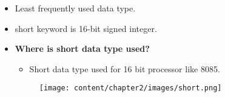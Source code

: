 

\begin{flushleft}
	\begin{itemize}
		\item Least frequently used data type.
		\item short keyword is 16-bit signed integer. 
		
		\bigskip
		\item \textbf{Where is short data type used?}
		\begin{itemize}
			\item Short data type used for 16 bit processor like 8085.
		\end{itemize}	
	
		\begin{figure}[h!]
			\centering
			\texttt{[image: content/chapter2/images/short.png]}
		\end{figure}		
	\end{itemize}
	
\end{flushleft}
\newpage
